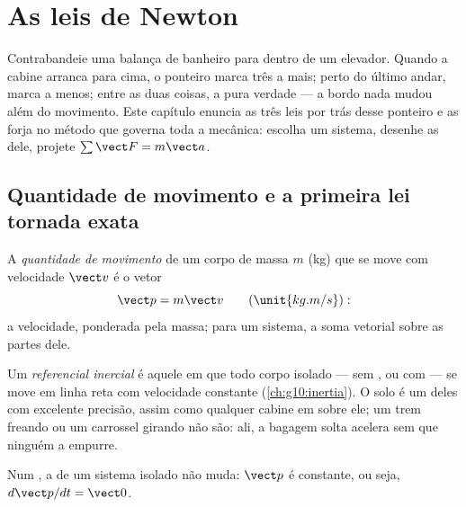 \chapter{As leis de Newton}\label{ch:g12:newtons-laws}

Contrabandeie uma balança de banheiro para dentro de um elevador. Quando a cabine
arranca para cima, o ponteiro marca três  a mais; perto do último andar,
marca a menos; entre as duas coisas, a pura verdade --- a bordo nada mudou além do
movimento. Este capítulo enuncia as três leis por trás desse ponteiro e as forja no
método que governa toda a mecânica: escolha um sistema, desenhe as  dele,
projete $\sum \vect F = m\vect a$.

\section{Quantidade de movimento e a primeira lei tornada exata}

\begin{definition}\label{def:g12:newtons-laws:momentum}
A \emph{quantidade de movimento} de um corpo de massa
$m$ (\unit{kg}) que se move com velocidade $\vect v$ é o vetor
\[
\vect p = m \vect v \qquad (\unit{kg.m/s}):
\]
a velocidade, ponderada pela massa; para um sistema, a soma vetorial sobre as partes
dele.
\end{definition}

\begin{definition}\label{def:g12:newtons-laws:inertial}
Um \emph{referencial inercial} é aquele em que todo corpo
isolado --- sem , ou com  --- se move em linha reta com
velocidade constante (\cref{ch:g10:inertia}). O solo é um deles com excelente
precisão, assim como qualquer cabine em  sobre ele; um
trem freando ou um carrossel girando não são: ali, a bagagem solta acelera sem que
ninguém a empurre.
\end{definition}

\begin{theorem}\label{thm:g12:newtons-laws:first}
Num , a  de um sistema isolado não muda:
$\vect p$ é constante, ou seja, $d\vect p/dt = \vect 0$.
\end{theorem}
\admitted

